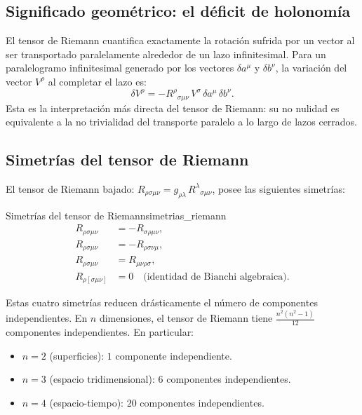 \subsection{Significado geométrico: el déficit de holonomía}

El tensor de Riemann cuantifica exactamente la rotación sufrida por un vector al ser transportado paralelamente alrededor de un lazo infinitesimal. Para un paralelogramo infinitesimal generado por los vectores $\delta a^\mu$ y $\delta b^\nu$, la variación del vector $V^\rho$ al completar el lazo es:
\begin{equation}
  \delta V^\rho = -R^\rho{}_{\sigma\mu\nu}\, V^\sigma\, \delta a^\mu\, \delta b^\nu.
  \label{eq:holonomia_riemann}
\end{equation}
Esta es la interpretación más directa del tensor de Riemann: su no nulidad es equivalente a la no trivialidad del transporte paralelo a lo largo de lazos cerrados.

\subsection{Simetrías del tensor de Riemann}

El tensor de Riemann bajado: $R_{\rho\sigma\mu\nu} = g_{\rho\lambda}\, R^\lambda{}_{\sigma\mu\nu}$, posee las siguientes simetrías:

\begin{proposicion}{Simetrías del tensor de Riemann}{simetrias_riemann}
\begin{align}
  R_{\rho\sigma\mu\nu} &= -R_{\sigma\rho\mu\nu}, \label{eq:rie_sym1}\\
  R_{\rho\sigma\mu\nu} &= -R_{\rho\sigma\nu\mu}, \label{eq:rie_sym2}\\
  R_{\rho\sigma\mu\nu} &= R_{\mu\nu\rho\sigma}, \label{eq:rie_sym3}\\
  R_{\rho[\sigma\mu\nu]} &= 0 \quad\text{(identidad de Bianchi algebraica).} \label{eq:rie_sym4}
\end{align}
\end{proposicion}

Estas cuatro simetrías reducen drásticamente el número de componentes independientes. En $n$ dimensiones, el tensor de Riemann tiene $\tfrac{n^2(n^2-1)}{12}$ componentes independientes. En particular:
\begin{itemize}
  \item $n=2$ (superficies): $1$ componente independiente.
  \item $n=3$ (espacio tridimensional): $6$ componentes independientes.
  \item $n=4$ (espacio-tiempo): $20$ componentes independientes.
\end{itemize}

